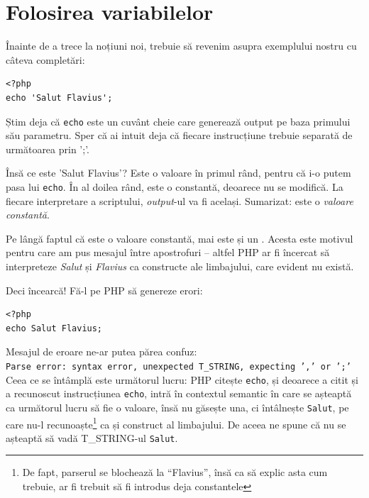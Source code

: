 \section{Folosirea variabilelor}
Înainte de a trece la noțiuni noi, trebuie să revenim asupra exemplului nostru
cu câteva completări:
\begin{lstlisting}
<?php
echo 'Salut Flavius';
\end{lstlisting}
Știm deja că \texttt{echo} este un cuvânt cheie care generează output pe baza
primului său parametru. Sper că ai intuit deja că fiecare instrucțiune
trebuie separată de următoarea prin ';'.

Însă ce este 'Salut Flavius'? Este o valoare în primul rând, pentru că
i-o putem pasa lui \texttt{echo}. În al doilea rând, este o constantă,
deoarece nu se modifică. La fiecare interpretare a scriptului, \textit{output}-ul
va fi același. Sumarizat: este o \textsl{valoare constantă}.

Pe lângă faptul că este o valoare constantă, mai este și un .
Acesta este motivul pentru care
am pus mesajul între apostrofuri -- altfel PHP ar fi încercat să
interpreteze \textsl{Salut} și \textsl{Flavius} ca constructe ale limbajului,
care evident nu există.


Deci încearcă! Fă-l pe PHP să genereze erori:
\begin{lstlisting}
<?php
echo Salut Flavius;
\end{lstlisting}
Mesajul de eroare ne-ar putea părea confuz:\\
\texttt{Parse error: syntax error, unexpected T\_STRING, expecting ',' or ';'}\\
Ceea ce se întâmplă este următorul lucru: PHP citește \texttt{echo}, și deoarece a citit
și a recunoscut instrucțiunea \texttt{echo}, intră în contextul semantic în care se așteaptă ca următorul
lucru să fie o valoare, însă nu găsește una, ci întâlnește \texttt{Salut},
pe care nu-l recunoaște\footnote{De fapt, parserul se blochează la ``Flavius'', însă
ca să explic asta cum trebuie, ar fi trebuit să fi introdus deja constantele}
ca și construct al limbajului.
De aceea ne spune că nu se așteaptă să vadă T\_STRING-ul \texttt{Salut}.


